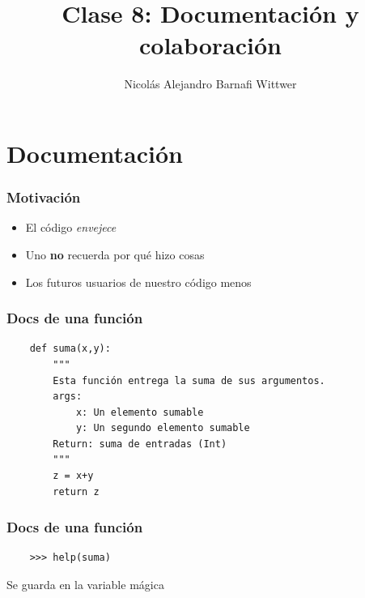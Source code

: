 \documentclass[14pt,aspectratio=169,xcolor=dvipsnames]{beamer}
\title[short title]{Clase 8: Documentación y colaboración}
\subtitle{}
\author[NA Barnafi] {Nicolás Alejandro Barnafi Wittwer}
\institute[UC|CMM] 
{
    Pontificia Universidad Católica de Chile \\
    Centro de Modelamiento Matemático
}
\date{}
\begin{document}
\begin{frame}
    \maketitle
\end{frame}
\section{Documentación}
\begin{frame}\frametitle{Motivación}
    \begin{itemize}
        \item El código \emph{envejece}
        \item Uno \textbf{no} recuerda por qué hizo cosas
        \item Los futuros usuarios de nuestro código \huge{menos}
    \end{itemize}
\end{frame}
\begin{frame}[fragile]\frametitle{Docs de una función}
    \begin{verbatim}
    def suma(x,y):
        """
        Esta función entrega la suma de sus argumentos. 
        args: 
            x: Un elemento sumable
            y: Un segundo elemento sumable
        Return: suma de entradas (Int)
        """
        z = x+y
        return z
    \end{verbatim}
\end{frame}
\begin{frame}[fragile]\frametitle{Docs de una función}
    \begin{verbatim}
    >>> help(suma)
    \end{verbatim}

    \vspace{1cm}
    Se guarda en la variable mágica 

\end{frame}
\end{document}
